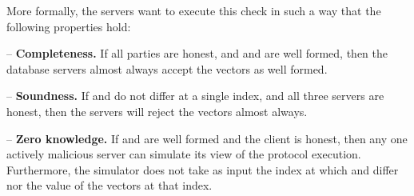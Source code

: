 \documentclass[10pt,twocolumn]{article}
\begin{document}
More formally, the servers want to execute this 
check in such a way that the following properties hold:
\begin{compactitem}
\item[--] \textbf{Completeness.} If all parties are honest, and
     and  are well formed, then the database servers 
    almost always accept the vectors as well formed.
\item[--] \textbf{Soundness.} If  and  do not differ
    at a single index, and all three servers are honest, then the
    servers will reject the vectors almost always.
\item[--] \textbf{Zero knowledge.} If  and  are well formed
    and the client is honest, then any one actively malicious server
    can simulate its view of the protocol execution. Furthermore,
    the simulator does not take as input the index at which  and 
    differ nor the value of the vectors at that index.
\end{compactitem}
\end{document}
